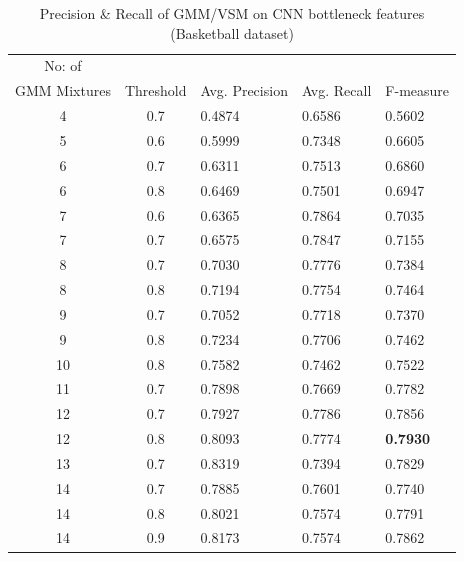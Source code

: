 \begin{table}[ht]
\caption[Event spotting using GMM/VSM on CNN (on pre-processed input) bottleneck features (Basketball dataset) ]{ Precision \& Recall  of GMM/VSM on CNN bottleneck features (Basketball dataset)}
\label{table:cnn_gmm_res_basket}
\centering
\begin{tabular}{|c|c|l|l|l|}
\hline
No: of &&&&\\
GMM Mixtures & Threshold & Avg. Precision & Avg. Recall & F-measure\\
\hline
\hline
4   &0.7    &0.4874     & 0.6586    &0.5602\\
5   &0.6    &0.5999     & 0.7348    &0.6605\\
6   &0.7    &0.6311     & 0.7513    &0.6860\\
6   &0.8    &0.6469     & 0.7501    &0.6947\\
7   &0.6    &0.6365     & 0.7864    &0.7035\\
7   &0.7    &0.6575     & 0.7847    &0.7155\\
8   &0.7    &0.7030     & 0.7776    &0.7384\\
8   &0.8    &0.7194     & 0.7754    &0.7464\\
9   &0.7    &0.7052     & 0.7718    &0.7370\\
9   &0.8    &0.7234     & 0.7706    &0.7462\\
10  &0.8    &0.7582     & 0.7462    &0.7522\\
11  &0.7    &0.7898     & 0.7669    &0.7782\\
12  &0.7    &0.7927     & 0.7786    &0.7856\\
12  &0.8    &0.8093     & 0.7774    &\textbf{0.7930}\\
13  &0.7    &0.8319     & 0.7394    &0.7829\\
14  &0.7    &0.7885     & 0.7601    &0.7740\\
14  &0.8    &0.8021     & 0.7574    &0.7791\\
14  &0.9    &0.8173     & 0.7574    &0.7862\\
\hline  
\end{tabular}
\end{table}

